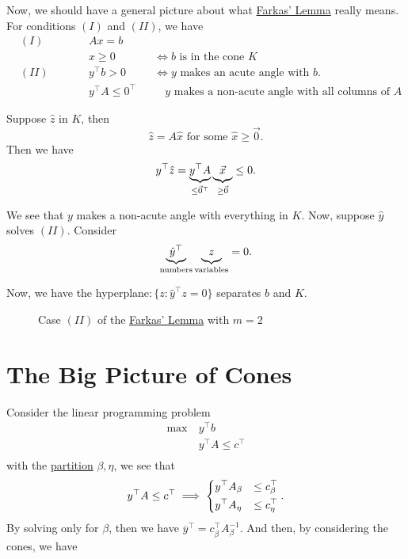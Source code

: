 Now, we should have a general picture about what \hyperref[lma:Farkas-lemma]{Farkas' Lemma} really means. For conditions \((I)\) and \((II)\), we have
\[
	\begin{alignedat}{3}
		& (I) \qquad&& Ax = b       \\
		&      && x\geq 0    && \iff b \text{ is in the cone }K \\
		& (II) \qquad&& y^{\top}b> 0 &&\iff y \text{ makes an acute angle with }b.\\
		&      && y^{\top}A\leq 0^{\top}&&\quad y\text{ makes a non-acute angle with all columns of }A
	\end{alignedat}
\]

Suppose \(\hat{z}\) in \(K\), then
\[
	\hat{z} = A \hat{x} \text{ for some }\hat{x} \geq  \vec{0}.
\]
Then we have
\[
	y^{\top} \hat{z} = \underbrace{y^{\top} A}_{\leq\vec{0}^{\top}} \underbrace{\vphantom{y}\vec{x}}_{\geq  \vec{0}}  \leq 0.
\]

We see that \(y\) makes a non-acute angle with everything in \(K\). Now, suppose \(\hat{y}\) solves \((II)\). Consider
\[
	\underbrace{\hat{y}^{\top}}_{\text{numbers}} \underbrace{\vphantom{y}z}_{\text{variables}} = 0.
\]

Now, we have the hyperplane\(\colon\)\(\{z\colon \hat{y} ^{\top} z = 0\}\) separates \(b\) and \(K\).

\begin{figure}[H]
	\centering
	\caption{Case \((II)\) of the \hyperref[lma:Farkas-lemma]{Farkas' Lemma} with \(m = 2\)}
	\label{fig:Farkas-lemma-extended}
\end{figure}

\section{The Big Picture of Cones}
Consider the linear programming problem
\[
	\begin{aligned}
		\max~ & y^{\top} b               \\
		      & y^{\top} A \leq c^{\top} \\
	\end{aligned}
\]
with the \hyperref[def:partition]{partition} \(\beta, \eta\), we see that
\[
	y^{\top} A \leq c^{\top} \implies \begin{dcases}
		y^{\top} A_{\beta} & \leq c^{\top}_{\beta} \\
		y^{\top} A_{\eta}  & \leq c^{\top}_{\eta}
	\end{dcases}.
\]
By solving only for \(\beta\), then we have \(\overline{y}^{\top} = c_{\beta}^{\top} A^{-1}_{\beta}\). And then, by considering the cones, we have

